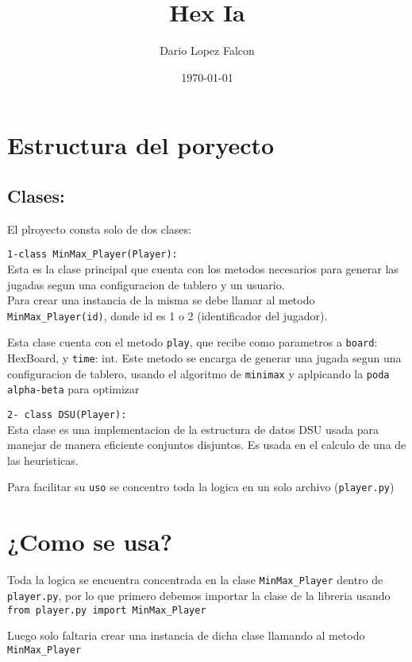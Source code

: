\documentclass[11pt]{article}
\title{ Hex Ia }
\author{ Dario Lopez Falcon }
\date{\today}
\begin{document}
\maketitle	

\section{Estructura del poryecto}

\subsection{Clases:}
El plroyecto consta solo de dos clases:

\texttt{1-class MinMax\_Player(Player):}\\
Esta es la clase principal que cuenta con los metodos necesarios para generar las jugadas segun una configuracion de tablero y un usuario.\\

Para crear una instancia de la misma se debe llamar al metodo \texttt{MinMax\_Player(id)}, donde id es 1 o 2 (identificador del jugador).

Esta clase cuenta con el metodo \texttt{play}, que recibe como parametros a \texttt{board}: HexBoard, y \texttt{time}: int. Este metodo se encarga de generar 
una jugada segun una configuracion de tablero, usando el algoritmo de \texttt{minimax} y aplpicando la \texttt{poda alpha-beta} para optimizar

\texttt{2- class DSU(Player):}\\

Esta clase es una implementacion de la estructura de datos DSU usada para manejar de manera eficiente 
conjuntos disjuntos.
Es usada en el calculo de una de las heuristicas.

Para facilitar su \texttt{uso} se concentro toda la logica en un solo archivo (\texttt{player.py})

\section{¿Como se usa?}

Toda la logica se encuentra concentrada en la clase \texttt{MinMax\_Player} dentro de \texttt{player.py}, por lo que 
primero debemos importar la clase de la libreria usando \texttt{from player.py import MinMax\_Player}

Luego solo faltaria crear una instancia de dicha clase llamando al metodo \texttt{MinMax\_Player}\\
\end{document}
